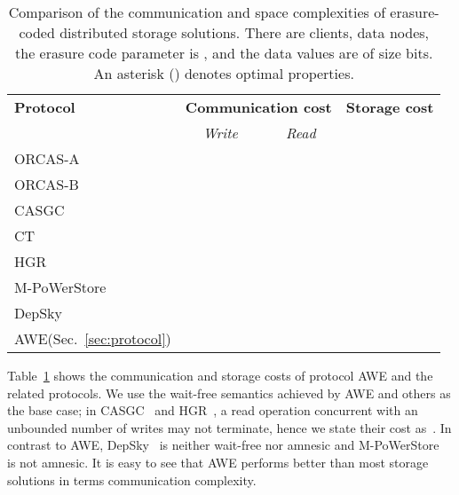 \documentclass[oribibl]{llncs}
\theoremstyle{definition-boldhead}
\newcommand{\op}[1]{\textsl{#1}}
\newcommand{\NAME}{AWE\xspace}
\newcommand{\nodes}{nodes\xspace}
\begin{document}
\begin{table}
 \centering
\begin{tabular}{|l||cc|c|}
 \hline
 {{\bf Protocol}}
 & \multicolumn{2}{|c|}{{\bf Communication cost} }
 & \multicolumn{1}{|c|}{{\bf Storage cost}}\\

 & \multicolumn{1}{|c}{\op{Write}}
 & \multicolumn{1}{c|}{\op{Read}}
 &
\\\hline

 ORCAS-A~\cite{dugule08}
 &  
 &  
 &  \\ \hline

 ORCAS-B~\cite{dugule08}
 & 
 & 
 & \\ \hline

 CASGC~\cite{clmm13}
 &  \T
 & 
 &  \\ \hline

 CT~\cite{cactes06}
 & 
 &  \T
 &  \T \\ \hline

 HGR~\cite{hegare07b}
 &  \T
 & 
 & \\  \hline

 M-PoWerStore~\cite{dklmsv13}
 &  \T
 & 
 &  \\ \hline

 DepSky~\cite{bcqas11}
 &  \T
 & 
 &  \\ \hline

 \NAME (Sec.~\ref{sec:protocol})
 &  \T
 & 
 & \\\hline
\end{tabular}
\caption{Comparison of the communication and space complexities of
  erasure-coded distributed storage solutions.  There are  clients, 
  data \nodes, the erasure code parameter is , and the data values
  are of size  bits. An asterisk (\T) denotes optimal properties.}
\label{tab:complexity}
\if\submit\yes
\vspace*{-4mm}
\fi
\end{table}

Table~\ref{tab:complexity} shows the communication and storage costs
of protocol \NAME and the related protocols.
We use the wait-free semantics achieved by \NAME and others as the
base case; in CASGC~\cite{clmm13} and HGR~\cite{hegare07b}, a read
operation concurrent with an unbounded number of writes may not
terminate, hence we state their cost as~.  In contrast to
\NAME, DepSky~\cite{bcqas11} is neither wait-free nor amnesic and
M-PoWerStore~\cite{dklmsv13} is not amnesic.  It is easy to see that
\NAME performs better than most storage solutions in terms
communication complexity.
\end{document}
